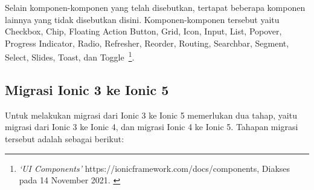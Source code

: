	Selain komponen-komponen yang telah disebutkan, tertapat beberapa komponen lainnya yang tidak disebutkan disini. Komponen-komponen tersebut yaitu Checkbox, Chip, Floating Action Button, Grid, Icon, Input, List, Popover, Progress Indicator, Radio, Refresher, Reorder, Routing, Searchbar, Segment, Select, Slides, Toast, dan Toggle~\footnote{\textit{`UI Components'} https://ionicframework.com/docs/components, Diakses pada 14 November 2021. \label{ref:uiComponents}}.

\subsection{Migrasi Ionic 3 ke Ionic 5}
\label{subsec:migrasi}

Untuk melakukan migrasi dari Ionic 3 ke Ionic 5 memerlukan dua tahap, yaitu migrasi dari Ionic 3 ke Ionic 4, dan migrasi Ionic 4 ke Ionic 5. Tahapan migrasi tersebut adalah sebagai berikut:

